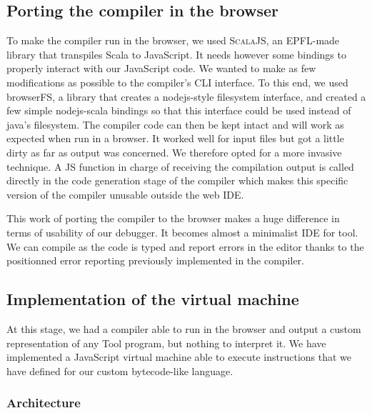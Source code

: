 


\subsection{Porting the compiler in the browser}

To make the compiler run in the browser, we used \textsc{ScalaJS}, an EPFL-made library that transpiles Scala to JavaScript.
It needs however some bindings to properly interact with our JavaScript code. We wanted to make as few modifications as possible to the compiler's CLI interface. To this end, we used browserFS, a library that creates a nodejs-style filesystem interface, and created a few simple nodejs-scala bindings so that this interface could be used instead of java's filesystem. The compiler code can then be kept intact and will work as expected when run in a browser. It worked well for input files but got a little dirty as far as output was concerned. We therefore opted for a more invasive technique. A JS function in charge of receiving the compilation output is called directly in the code generation stage of the compiler which makes this specific version of the compiler unusable outside the web IDE.

This work of porting the compiler to the browser makes a huge difference in terms of usability of our debugger. It becomes almost a minimalist IDE for tool. We can compile as the code is typed and report errors in the editor thanks to the positionned error reporting previously implemented in the compiler.

\subsection{Implementation of the virtual machine}

At this stage, we had a compiler able to run in the browser and output a custom representation of any Tool program, but nothing to interpret it.
We have implemented a JavaScript virtual machine able to execute instructions that we have defined for our custom bytecode-like language.

\subsubsection{Architecture}

